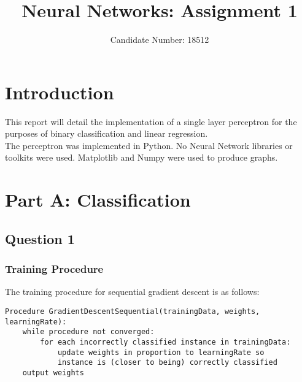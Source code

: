 \documentclass{article}
\title{Neural Networks: Assignment 1}
\author{Candidate Number: 18512}
\begin{document}
\maketitle

\section*{Introduction}
This report will detail the implementation of a single layer perceptron for the purposes of binary classification and linear regression. \\
\indent The perceptron was implemented in Python. No Neural Network libraries or toolkits were used. Matplotlib and Numpy were used to produce graphs.

\section*{Part A: Classification}
\subsection*{Question 1}
\subsubsection*{Training Procedure}
The training procedure for sequential gradient descent is as follows:

\begin{verbatim}
Procedure GradientDescentSequential(trainingData, weights, learningRate):
    while procedure not converged:
        for each incorrectly classified instance in trainingData:
            update weights in proportion to learningRate so
            instance is (closer to being) correctly classified
    output weights
\end{verbatim}
\end{document}
